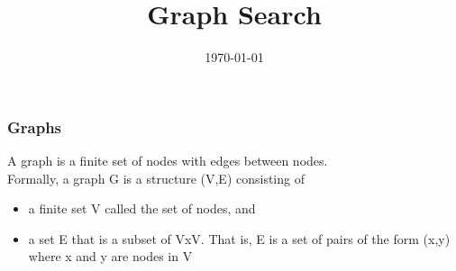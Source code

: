 \documentclass{beamer}
\title[Graph Search]{Graph Search} %
\institute[Parallel Programming] %
{
\large{Parallel Programming} \\
\large{} %
\medskip
}
\date{\today} %
\begin{document}
\begin{frame}
\titlepage %
\end{frame}





\begin{frame}
\frametitle{Graphs}
A graph is a finite set of nodes with edges between nodes.\\
Formally, a graph G is a structure (V,E) consisting of\\ 
\begin{itemize}
\item a finite set V called the set of nodes, and
\item a set E that is a subset of VxV. That is, E is a set of pairs of the form (x,y) where x and y are nodes in V 

\end{itemize}
\end{frame}
\end{document}
